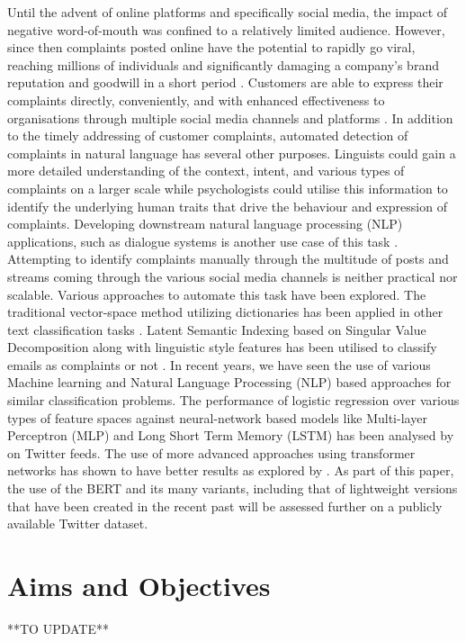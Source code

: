 Until the advent of online platforms and specifically social media, the impact of negative word-of-mouth was confined to a relatively limited audience. However, since then complaints posted online have the potential to rapidly go viral, reaching millions of individuals and significantly damaging a company's brand reputation and goodwill in a short period \cite{tripp_when_2011}. Customers are able to express their complaints directly, conveniently, and with enhanced effectiveness to organisations through multiple social media channels and platforms \cite{balaji_customer_2015}.
\newline \newline
In addition to the timely addressing of customer complaints, automated detection of complaints in natural language has several other purposes. Linguists could gain a more detailed understanding of the context, intent, and various types of complaints on a larger scale while psychologists could utilise this information to identify the underlying human traits that drive the behaviour and expression of complaints. Developing downstream natural language processing (NLP) applications, such as dialogue systems is another use case of this task \cite{preotiuc-pietro_automatically_2019}.
\newline \newline
Attempting to identify complaints manually through the multitude of posts and streams coming through the various social media channels is neither practical nor scalable. Various approaches to automate this task have been explored. The traditional vector-space method utilizing dictionaries has been applied in other text classification tasks \cite{liang_dictionary-based_2006}. Latent Semantic Indexing based on Singular Value Decomposition along with linguistic style features has been utilised to classify emails as complaints or not \cite{coussement_improving_2008}. In recent years, we have seen the use of various Machine learning and Natural Language Processing (NLP) based approaches for similar classification problems. The performance of logistic regression over various types of feature spaces against neural-network based models like Multi-layer Perceptron (MLP) and Long Short Term Memory (LSTM) has been analysed by \cite{preotiuc-pietro_automatically_2019} on Twitter feeds. The use of more advanced approaches using transformer networks has shown to have better results as explored by \cite{jin_complaint_2020}. As part of this paper, the use of the BERT and its many variants, including that of lightweight versions that have been created in the recent past will be assessed further on a publicly available Twitter dataset.

\section{Aims and Objectives}

**TO UPDATE**

